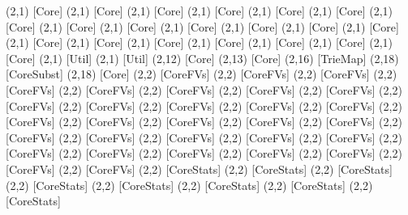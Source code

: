 {(2,1) [Core] %
(2,1) [Core] %
(2,1) [Core] %
(2,1) [Core] %
(2,1) [Core] %
(2,1) [Core] %
(2,1) [Core] %
(2,1) [Core] %
(2,1) [Core] %
(2,1) [Core] %
(2,1) [Core] %
(2,1) [Core] %
(2,1) [Core] %
(2,1) [Core] %
(2,1) [Core] %
(2,1) [Core] %
(2,1) [Core] %
(2,1) [Core] %
(2,1) [Core] %
(2,1) [Core] %
(2,1) [Util] %
(2,1) [Util] %
(2,12) [Core] %
(2,13) [Core] %
(2,16) [TrieMap] %
(2,18) [CoreSubst] %
(2,18) [Core] %
(2,2) [CoreFVs] %
(2,2) [CoreFVs] %
(2,2) [CoreFVs] %
(2,2) [CoreFVs] %
(2,2) [CoreFVs] %
(2,2) [CoreFVs] %
(2,2) [CoreFVs] %
(2,2) [CoreFVs] %
(2,2) [CoreFVs] %
(2,2) [CoreFVs] %
(2,2) [CoreFVs] %
(2,2) [CoreFVs] %
(2,2) [CoreFVs] %
(2,2) [CoreFVs] %
(2,2) [CoreFVs] %
(2,2) [CoreFVs] %
(2,2) [CoreFVs] %
(2,2) [CoreFVs] %
(2,2) [CoreFVs] %
(2,2) [CoreFVs] %
(2,2) [CoreFVs] %
(2,2) [CoreFVs] %
(2,2) [CoreFVs] %
(2,2) [CoreFVs] %
(2,2) [CoreFVs] %
(2,2) [CoreFVs] %
(2,2) [CoreFVs] %
(2,2) [CoreFVs] %
(2,2) [CoreFVs] %
(2,2) [CoreFVs] %
(2,2) [CoreStats] %
(2,2) [CoreStats] %
(2,2) [CoreStats] %
(2,2) [CoreStats] %
(2,2) [CoreStats] %
(2,2) [CoreStats] %
(2,2) [CoreStats] %
(2,2) [CoreStats] %
}
